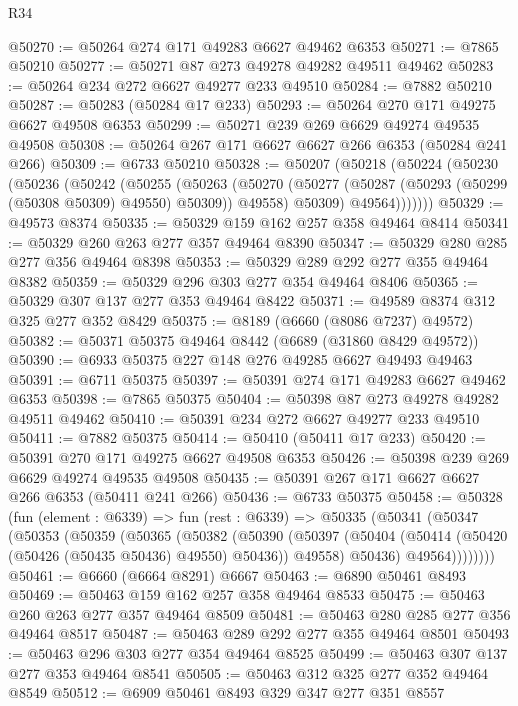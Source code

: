 \begin{lexlean}{R34}
\begin{coremodule}
@50270 := @50264 @274 @171 @49283 @6627 @49462 @6353
@50271 := @7865 @50210
@50277 := @50271 @87 @273 @49278 @49282 @49511 @49462
@50283 := @50264 @234 @272 @6627 @49277 @233 @49510
@50284 := @7882 @50210
@50287 := @50283 (@50284 @17 @233)
@50293 := @50264 @270 @171 @49275 @6627 @49508 @6353
@50299 := @50271 @239 @269 @6629 @49274 @49535 @49508
@50308 := @50264 @267 @171 @6627 @6627 @266 @6353 (@50284 @241 @266)
@50309 := @6733 @50210
@50328 := @50207
    (@50218
      (@50224
        (@50230
          (@50236
            (@50242
              (@50255
                (@50263
                  (@50270
                    (@50277 (@50287 (@50293 (@50299 (@50308 @50309) @49550) @50309)) @49558)
                    @50309)
                  @49564)))))))
@50329 := @49573 @8374
@50335 := @50329 @159 @162 @257 @358 @49464 @8414
@50341 := @50329 @260 @263 @277 @357 @49464 @8390
@50347 := @50329 @280 @285 @277 @356 @49464 @8398
@50353 := @50329 @289 @292 @277 @355 @49464 @8382
@50359 := @50329 @296 @303 @277 @354 @49464 @8406
@50365 := @50329 @307 @137 @277 @353 @49464 @8422
@50371 := @49589 @8374 @312 @325 @277 @352 @8429
@50375 := @8189 (@6660 (@8086 @7237) @49572)
@50382 := @50371 @50375 @49464 @8442 (@6689 (@31860 @8429 @49572))
@50390 := @6933 @50375 @227 @148 @276 @49285 @6627 @49493 @49463
@50391 := @6711 @50375
@50397 := @50391 @274 @171 @49283 @6627 @49462 @6353
@50398 := @7865 @50375
@50404 := @50398 @87 @273 @49278 @49282 @49511 @49462
@50410 := @50391 @234 @272 @6627 @49277 @233 @49510
@50411 := @7882 @50375
@50414 := @50410 (@50411 @17 @233)
@50420 := @50391 @270 @171 @49275 @6627 @49508 @6353
@50426 := @50398 @239 @269 @6629 @49274 @49535 @49508
@50435 := @50391 @267 @171 @6627 @6627 @266 @6353 (@50411 @241 @266)
@50436 := @6733 @50375
@50458 := @50328
    (fun (element : @6339) =>
    fun (rest : @6339) =>
    @50335
      (@50341
        (@50347
          (@50353
            (@50359
              (@50365
                (@50382
                  (@50390
                    (@50397
                      (@50404 (@50414 (@50420 (@50426 (@50435 @50436) @49550) @50436)) @49558)
                      @50436)
                    @49564))))))))
@50461 := @6660 (@6664 @8291) @6667
@50463 := @6890 @50461 @8493
@50469 := @50463 @159 @162 @257 @358 @49464 @8533
@50475 := @50463 @260 @263 @277 @357 @49464 @8509
@50481 := @50463 @280 @285 @277 @356 @49464 @8517
@50487 := @50463 @289 @292 @277 @355 @49464 @8501
@50493 := @50463 @296 @303 @277 @354 @49464 @8525
@50499 := @50463 @307 @137 @277 @353 @49464 @8541
@50505 := @50463 @312 @325 @277 @352 @49464 @8549
@50512 := @6909 @50461 @8493 @329 @347 @277 @351 @8557

\end{coremodule}
\end{lexlean}
